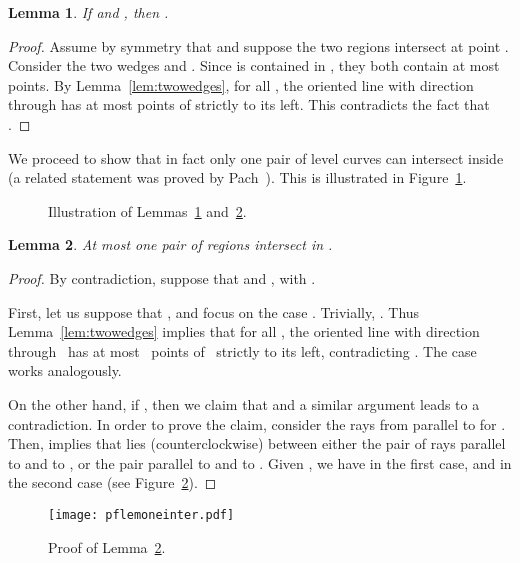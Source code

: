 \documentclass[english,11pt]{article}
\newtheorem{lemma}{Lemma}
\begin{document}
\begin{lemma}
\label{lem:antipodal}
If  and , then .
\end{lemma}
\begin{proof}
Assume by symmetry that  and suppose the two regions intersect
at point . Consider the two wedges  and . Since  is contained 
in , they both contain at most  points. 
By Lemma~\ref{lem:twowedges}, for all , the oriented line
with direction  through  has at most  points of  strictly to its left.
This contradicts the fact that .
\end{proof}

We proceed to show that in fact only one pair of level curves can intersect inside  (a related statement was proved by Pach~\cite{Pach86}). 
This is illustrated in Figure~\ref{fig:cprimes}.\bigskip

\begin{figure}[htb]
\begin{center}
\hspace{2cm}
\end{center}
\caption{\label{fig:cprimes}Illustration of Lemmas~\ref{lem:antipodal} and~\ref{lem:oneinter}.}
\end{figure}

\begin{lemma}
\label{lem:oneinter}
At most one pair of regions  intersect in .
\end{lemma}
\begin{proof}
By contradiction, suppose that  and 
, with .

First, let us suppose that , and focus on the case . Trivially, . Thus Lemma~\ref{lem:twowedges} implies that for all , the oriented line with direction  through~ has at most~ points of~ strictly to its left, contradicting . The case  works analogously.

On the other hand, if , then we claim that  and a similar argument leads to a contradiction. 
In order to prove the claim, consider the rays from  parallel to  for . Then,  implies that  lies (counterclockwise) between either the pair of rays parallel to  and to , or the pair parallel to  and to . Given , we have  in the first case, and  in the second case (see Figure~\ref{fig:pflemoneinter}).
\end{proof}

\begin{figure}[htb]
\begin{center}
\texttt{[image: pflemoneinter.pdf]}
\end{center}
\caption{\label{fig:pflemoneinter}Proof of Lemma~\ref{lem:oneinter}.}
\end{figure}
\end{document}
